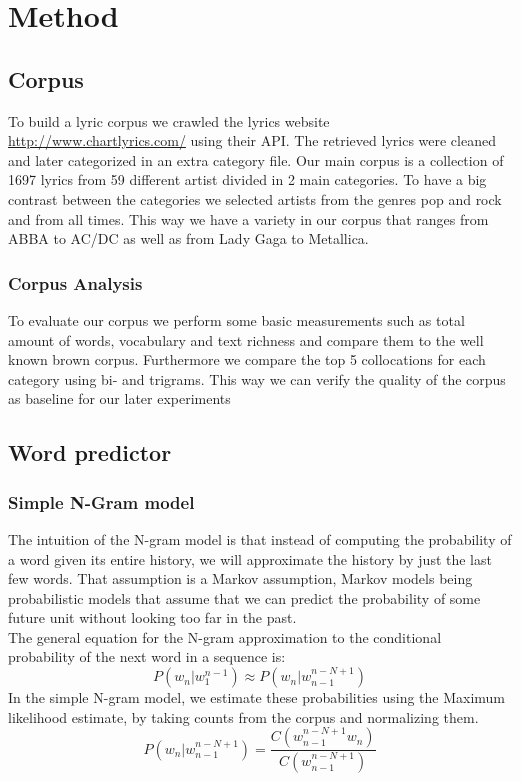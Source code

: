 \documentclass[a4paper,12pt]{article}
\begin{document}
\section{Method}
\label{sec:method}
\subsection{Corpus}

To build a lyric corpus we crawled the lyrics website \url{http://www.chartlyrics.com/} using their API. The retrieved lyrics were cleaned and later categorized in an extra category file. Our main corpus is a collection of 1697 lyrics from 59 different artist divided in 2 main categories. To have a big contrast between the categories we selected artists from the genres pop and rock and from all times. This way we have a variety in our corpus that ranges from ABBA to AC/DC as well as from Lady Gaga to Metallica. 

\subsubsection{Corpus Analysis}
To evaluate our corpus we perform some basic measurements such as total amount of words, vocabulary and text richness and compare them to the well known brown corpus. Furthermore we compare the top 5 collocations for each category using bi- and trigrams. This way we can verify the quality of the corpus as baseline for our later experiments 

\subsection{Word predictor}
\subsubsection{Simple N-Gram model}
The intuition of the N-gram model is that instead of computing the probability of a word given its entire history, we will approximate the history by just the last few words. That assumption is a Markov assumption, Markov models being probabilistic models that assume that we can predict the probability of some future unit without looking too far in the past. \\
The general equation for the N-gram approximation to the conditional probability of the next word in a sequence is:
\begin{equation}
P(w_n|w_1^{n-1}) \approx P(w_n|w_{n-1}^{n-N+1})
\end{equation}
In the simple N-gram model, we estimate these probabilities using the Maximum likelihood estimate, by taking counts from the corpus and normalizing them.
\begin{equation}
P(w_n|w_{n-1}^{n-N+1}) = \frac{C(w_{n-1}^{n-N+1} w_{n})}{C(w_{n-1}^{n-N+1})}
\end{equation}
\end{document}
